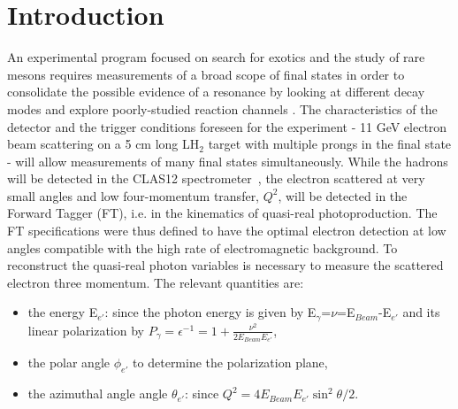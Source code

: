 \section{Introduction}
An experimental program focused on search for exotics and the study of rare mesons requires measurements of a broad scope of final states in order to consolidate the possible evidence of a resonance by looking at different decay modes and explore poorly-studied reaction channels \cite{mesonex}.
The characteristics of the detector and the trigger conditions foreseen for the experiment - 11 GeV electron beam scattering on a 5 cm long LH$_2$ target with multiple prongs in the final state - will allow  measurements of many final states simultaneously. While the hadrons will be detected in the CLAS12 spectrometer~\cite{overview}, the electron scattered at very small angles and low four-momentum transfer, $Q^2$,  will be detected in the Forward Tagger (FT), i.e. in the kinematics of quasi-real photoproduction.
The FT  specifications  were thus defined to have the optimal electron detection at low angles compatible with the high rate of electromagnetic background.
To reconstruct the  quasi-real photon variables is necessary to measure the scattered electron three momentum.
The relevant quantities are:
\begin{itemize}
\item the energy E$_{e'}$: since the photon energy is given by E$_\gamma$=$\nu$=E$_{Beam}$-E$_{e'}$ and its linear polarization
 by $P_\gamma=\epsilon^{-1}=1+\frac{\nu^2}{2 E_{Beam} E_{e'}}$,
\item the polar angle $\phi_{e'}$ to determine the polarization plane, 
\item the azimuthal angle angle $\theta_{e'}$: since $Q^2 = 4 E_{Beam} E_{e'} \sin^2{\theta/2}$.
\end{itemize}

